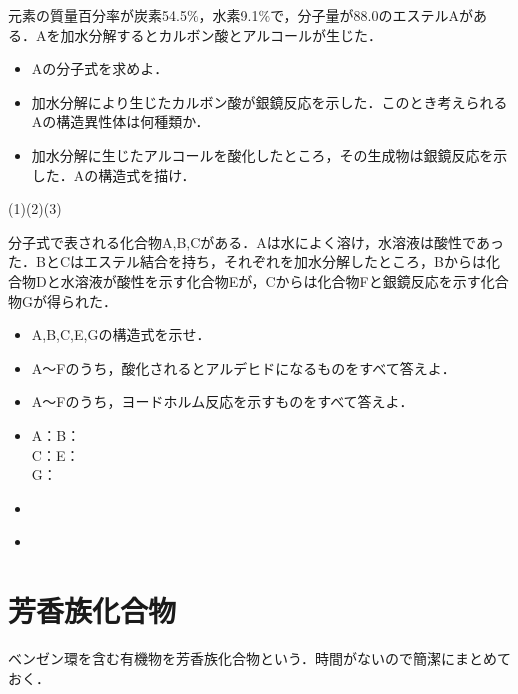 \documentclass[a4paper,12pt]{ltjsreport}
\begin{document}
\newpage
\begin{que}
元素の質量百分率が炭素54.5$\%$，水素9.1$\%$で，分子量が88.0のエステルAがある．Aを加水分解するとカルボン酸とアルコールが生じた．
\begin{itemize}
    \item[(1)]Aの分子式を求めよ．
    \item [(2)]加水分解により生じたカルボン酸が銀鏡反応を示した．このとき考えられるAの構造異性体は何種類か．
    \item [(3)]加水分解に生じたアルコールを酸化したところ，その生成物は銀鏡反応を示した．Aの構造式を描け．
\end{itemize}
\end{que}
\ans \noindent (1)\hspace{150pt}(2)\hspace{150pt}(3)
\newpage
\begin{que}
分子式で表される化合物A,B,Cがある．Aは水によく溶け，水溶液は酸性であった．BとCはエステル結合を持ち，それぞれを加水分解したところ，Bからは化合物Dと水溶液が酸性を示す化合物Eが，Cからは化合物Fと銀鏡反応を示す化合物Gが得られた．
\begin{itemize}
    \item [(1)]A,B,C,E,Gの構造式を示せ．
    \item [(2)]A〜Fのうち，酸化されるとアルデヒドになるものをすべて答えよ．
    \item [(3)]A〜Fのうち，ヨードホルム反応を示すものをすべて答えよ．
\end{itemize}
\end{que}
\begin{itemize}
    \item [(1)]A：\hspace{200pt}B：\\[80pt]
    C：\hspace{200pt}E：\\[80pt]
    G：\\[80pt]
    \item [(2)]　\\[15pt]
    \item [(3)]
\end{itemize}
\chapter{芳香族化合物}
ベンゼン環を含む有機物を芳香族化合物という．時間がないので簡潔にまとめておく．
\end{document}
